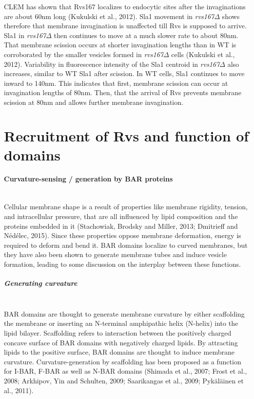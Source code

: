 \newpage
CLEM has shown that Rvs167 localizes to endocytic sites after the invaginations are about 60nm long (Kukulski et al., 2012). Sla1 movement in \textit{rvs167$\Delta$} shows therefore that membrane invagination is unaffected till Rvs is supposed to arrive. Sla1 in \textit{rvs167$\Delta$} then continues to move at a much slower rate to about 80nm. That membrane scission occurs at shorter invagination lengths than in WT is corroborated by the smaller vesicles formed in \textit{rvs167$\Delta$} cells (Kukulski et al., 2012).  Variability in fluorescence intensity of the Sla1 centroid in \textit{rvs167$\Delta$} also increases, similar to WT Sla1 after scission. In WT cells, Sla1 continues to move inward to 140nm. This indicates that first, membrane scission can occur at invagination lengths of 80nm. Then, that the arrival of Rvs prevents membrane scission at 80nm  and allows further membrane invagination. 




\newpage
\section{Recruitment of Rvs and function of \\domains} 
\label{scaffolding_rvs}
	\paragraph{Curvature-sensing / generation by BAR proteins }
					\mbox{}\\
Cellular membrane shape is a result of properties like membrane rigidity, tension, and intracellular pressure, that are all influenced by lipid composition and the proteins embedded in it (Stachowiak, Brodsky and Miller, 2013; Dmitrieff and Nédélec, 2015). Since these properties oppose membrane deformation, energy is required to deform and bend it. BAR domains localize to curved membranes, but they have also been shown to generate membrane tubes and induce vesicle formation, leading to some discussion on the interplay between these functions. 


	\vspace{5mm}
			
				\subparagraph{Generating curvature }
				\mbox{}\\
BAR domains are thought to generate membrane curvature by either scaffolding the membrane or inserting an N-terminal amphipathic helix (N-helix) into the lipid bilayer. 
Scaffolding refers to interaction between the positively charged concave surface of BAR domains with negatively charged lipids. By attracting lipids to the positive surface, BAR domains are thought to induce membrane curvature. Curvature-generation by scaffolding has been proposed as a function for I-BAR, F-BAR as well as N-BAR domains (Shimada et al., 2007; Frost et al., 2008; Arkhipov, Yin and Schulten, 2009; Saarikangas et al., 2009; Pykäläinen et al., 2011). 
	\vspace{5mm}
	
